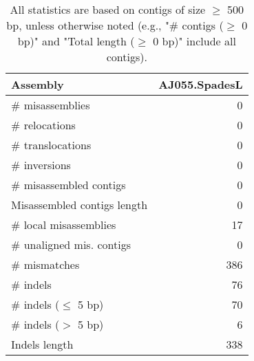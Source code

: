 \documentclass[12pt,a4paper]{article}
\begin{document}
\begin{table}[ht]
\begin{center}
\caption{All statistics are based on contigs of size $\geq$ 500 bp, unless otherwise noted (e.g., "\# contigs ($\geq$ 0 bp)" and "Total length ($\geq$ 0 bp)" include all contigs).}
\begin{tabular}{|l*{1}{|r}|}
\hline
Assembly & AJ055.SpadesL \\ \hline
\# misassemblies & 0 \\ \hline
\hspace{5mm}\# relocations & 0 \\ \hline
\hspace{5mm}\# translocations & 0 \\ \hline
\hspace{5mm}\# inversions & 0 \\ \hline
\# misassembled contigs & 0 \\ \hline
Misassembled contigs length & 0 \\ \hline
\# local misassemblies & 17 \\ \hline
\# unaligned mis. contigs & 0 \\ \hline
\# mismatches & 386 \\ \hline
\# indels & 76 \\ \hline
\hspace{5mm}\# indels ($\leq$ 5 bp) & 70 \\ \hline
\hspace{5mm}\# indels ($>$ 5 bp) & 6 \\ \hline
Indels length & 338 \\ \hline
\end{tabular}
\end{center}
\end{table}
\end{document}
